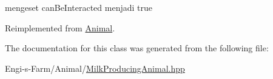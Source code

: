 mengeset can\+Be\+Interacted menjadi true 

Reimplemented from \mbox{\hyperlink{class_animal_a2810cff283192d06f93612364b8120f9}{Animal}}.



The documentation for this class was generated from the following file\+:\begin{DoxyCompactItemize}
\item 
Engi-\/s-\/\+Farm/\+Animal/\mbox{\hyperlink{_milk_producing_animal_8hpp}{Milk\+Producing\+Animal.\+hpp}}\end{DoxyCompactItemize}
